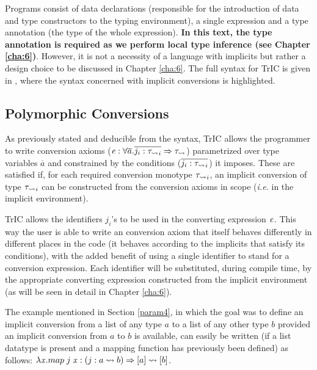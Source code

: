 Programs consist of data declarations (responsible for the introduction of data and type constructors to the typing environment), a single expression and a type annotation (the type of the whole expression). \textbf{In this text, the type annotation is required as we perform local type inference (see Chapter \ref{cha:6})}. However, it is not a necessity of a language with implicits but rather a design choice to be discussed in Chapter \ref{cha:6}. The full syntax for TrIC is given in , where the syntax concerned with implicit conversions is highlighted.

\subsection{Polymorphic Conversions}
\label{polymorphic conversions}
As previously stated and deducible from the syntax, TrIC allows the programmer to write conversion axioms ($\mathit{e} : \forall \overline{a}.\overline{j_i : \mathit{\tau_{\rightsquigarrow}}_i} \Rightarrow \mathit{\tau_{\rightsquigarrow}}$) parametrized over type variables $\overline{a}$  and constrained by the conditions ($\overline{j_i : \mathit{\tau_{\rightsquigarrow}}_i}$) it imposes. These are satisfied if, for each required conversion monotype $\mathit{\tau_{\rightsquigarrow}}_i$, an implicit conversion of type $\mathit{\tau_{\rightsquigarrow}}_i$ can be constructed from the conversion axioms in scope (\textit{i.e.} in the implicit environment).

TrIC allows the identifiers $j_i$'s to be used in the converting expression $\mathit{e}$. This way the user is able to write an conversion axiom that itself behaves differently in different places in the code (it behaves according to the implicits that satisfy its conditions), with the added benefit of using a single identifier to stand for a conversion expression. Each identifier will be substituted, during compile time, by the appropriate converting expression constructed from the implicit environment (as will be seen in detail in Chapter \ref{cha:6}).

The example mentioned in Section \ref{param4}, in which the goal was to define an implicit conversion from a list of any type $a$ to a list of any other type $b$ provided an implicit conversion from $a$ to $b$ is available, can easily be written (if a list datatype is present and a mapping function has previously been defined) as follows: $\lambda \mathit{x} . map\;j\;\mathit{x} : (j: a \rightsquigarrow b) \Rightarrow [a] \rightsquigarrow [b]$.
